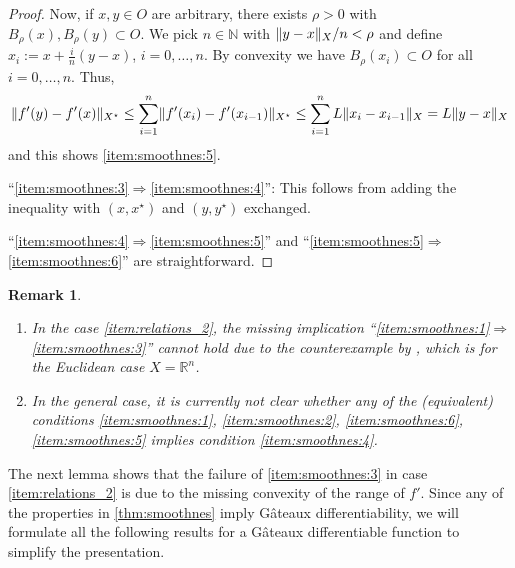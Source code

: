 \documentclass[
	english
]{scrartcl}
\numberwithin{equation}{section} %
\let\cite\parencite
\DeclarePairedDelimiter\norm{\lVert}{\rVert}
\newcommand\N{\mathbb{N}}
\newcommand\R{\mathbb{R}}
\newcommand{\dualspace}{^\star}
\newtheorem{remark}[theorem]{Remark}
\begin{document}
\begin{proof}
	Now, if $x,y \in O$ are arbitrary,
	there exists $\rho > 0$ with
	$B_\rho(x),B_\rho(y) \subset O$.
	We pick $n \in \N$ with $\norm{y - x}_X / n < \rho$
	and define
	$x_i := x + \frac{i}{n}(y - x)$, $i = 0,\ldots, n$.
	By convexity we have $B_\rho(x_i) \subset O$
	for all $i = 0,\ldots, n$.
	Thus,
	\begin{equation*}
		\norm{f'(y) - f'(x)}_{X\dualspace}
		\le
		\sum_{i = 1}^n \norm{f'(x_i) - f'(x_{i-1})}_{X\dualspace}
		\le
		\sum_{i = 1}^n L \norm{x_i - x_{i-1}}_{X}
		=
		L \norm{y - x}_X
	\end{equation*}
	and this shows \ref{item:smoothnes:5}.

	``\ref{item:smoothnes:3}$\Rightarrow$\ref{item:smoothnes:4}'':
	This follows from adding the inequality
	with $(x,x\dualspace)$ and $(y,y\dualspace)$ exchanged.

	``\ref{item:smoothnes:4}$\Rightarrow$\ref{item:smoothnes:5}''
	and
	``\ref{item:smoothnes:5}$\Rightarrow$\ref{item:smoothnes:6}''
	are straightforward.
\end{proof}
\begin{remark}\leavevmode
	\label{rem:counterexample_and_open_question}
	\begin{enumerate}
		\item
			In the case
			\ref{item:relations_2},
			the missing implication
			``\ref{item:smoothnes:1}$\Rightarrow$\ref{item:smoothnes:3}''
			cannot hold due to the counterexample by \cite[Section~2]{Drori2020},
			which is for the Euclidean case $X=\R^n$.

		\item
			In the general case,
			it is currently not clear whether any of
			the (equivalent) conditions
			\ref{item:smoothnes:1},
			\ref{item:smoothnes:2},
			\ref{item:smoothnes:6},
			\ref{item:smoothnes:5}
			implies condition
			\ref{item:smoothnes:4}.
	\end{enumerate}
\end{remark}

The next lemma shows that the failure of
\ref{item:smoothnes:3}
in case \ref{item:relations_2}
is due to the missing convexity of the range of $f'$.
Since any of the properties in \cref{thm:smoothnes} imply Gâteaux differentiability,
we will formulate all the following results for a Gâteaux differentiable function to simplify the presentation.
\end{document}
